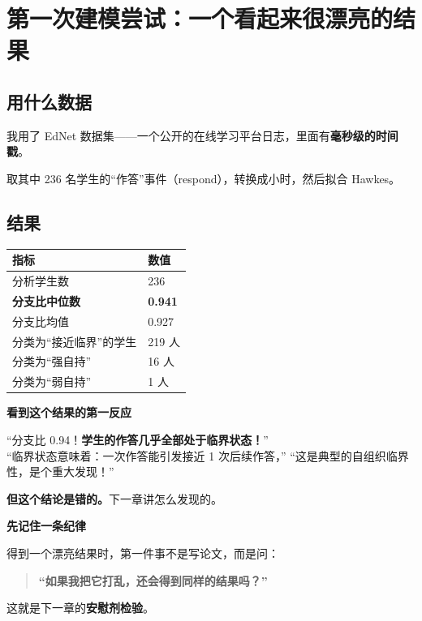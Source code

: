 \documentclass[UTF8,a4paper,11pt]{ctexart}
\newenvironment{explainbox}[1]
{\begin{center}\begin{minipage}{0.94\textwidth}\colorbox{boxbg}{\parbox{0.92\textwidth}{\textbf{#1}\par\vspace{2pt}}}}
{\end{minipage}\end{center}}
\newcommand{\term}[1]{\textbf{#1}}
\newcommand{\warn}[1]{\textcolor{red!70!black}{\textbf{#1}}}
\begin{document}
\section{第一次建模尝试：一个看起来很漂亮的结果}

\subsection{用什么数据}

我用了 EdNet 数据集——一个公开的在线学习平台日志，里面有\textbf{毫秒级的时间戳}。

取其中 236 名学生的“作答”事件（respond），转换成小时，然后拟合 Hawkes。

\subsection{结果}

\begin{center}
\begin{tabular}{p{5.6cm}p{7.6cm}}
\toprule
\textbf{指标} & \textbf{数值} \\
\midrule
分析学生数 & 236 \\
\textbf{分支比中位数} & \textbf{0.941} \\
分支比均值 & 0.927 \\
分类为“接近临界”的学生 & 219 人 \\
分类为“强自持” & 16 人 \\
分类为“弱自持” & 1 人 \\
\bottomrule
\end{tabular}
\end{center}

\begin{explainbox}{看到这个结果的第一反应}
“分支比 0.94！\textbf{学生的作答几乎全部处于临界状态！}”\\
“临界状态意味着：一次作答能引发接近 1 次后续作答，”
“这是典型的自组织临界性，是个重大发现！”
\end{explainbox}

\warn{但这个结论是错的。}下一章讲怎么发现的。

\begin{explainbox}{先记住一条纪律}
得到一个漂亮结果时，第一件事不是写论文，而是问：
\begin{quote}
\textbf{“如果我把它打乱，还会得到同样的结果吗？”}
\end{quote}
这就是下一章的\term{安慰剂检验}。
\end{explainbox}
\end{document}
